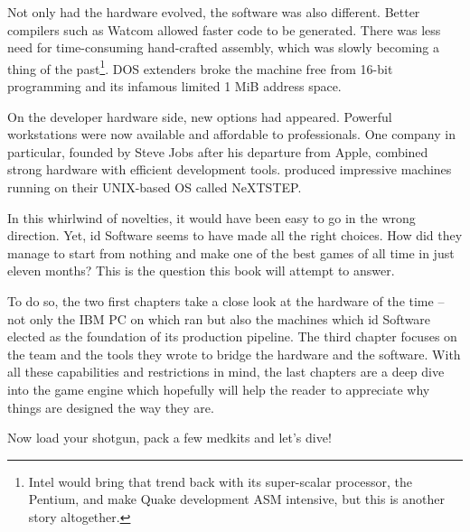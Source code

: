  Not only had the hardware evolved, the software was also different. Better compilers such as Watcom allowed faster code to be generated. There was less need for time-consuming hand-crafted assembly, which was slowly becoming a thing of the past\footnote{Intel would bring that trend back with its super-scalar processor, the Pentium, and make Quake development ASM intensive, but this is another story altogether.}. DOS extenders broke the machine free from 16-bit programming and its infamous limited 1 MiB address space.\\
 \par
 On the developer hardware side, new options had appeared. Powerful workstations were now available and affordable to professionals. One company in particular, founded by Steve Jobs after his departure from Apple, combined strong hardware with efficient development tools. \NeXT produced impressive machines running on their UNIX-based OS called NeXTSTEP.\\%
 \par
 In this whirlwind of novelties, it would have been easy to go in the wrong direction. Yet, id Software seems to have made all the right choices. How did they manage to start from nothing and make one of the best games of all time in just eleven months? This is the question this book will attempt to answer.\\
 \par
 To do so, the two first chapters take a close look at the hardware of the time -- not only the IBM PC on which \doom{} ran but also the \NeXT machines which id Software elected as the foundation of its production pipeline. The third chapter focuses on the team and the tools they wrote to bridge the hardware and the software. With all these capabilities and restrictions in mind, the last chapters are a deep dive into the game engine which hopefully will help the reader to appreciate why things are designed the way they are.\\
\par
Now load your shotgun, pack a few medkits and let's dive!\\
\par
\par
{
\setlength{\abovecaptionskip}{15pt}
}

